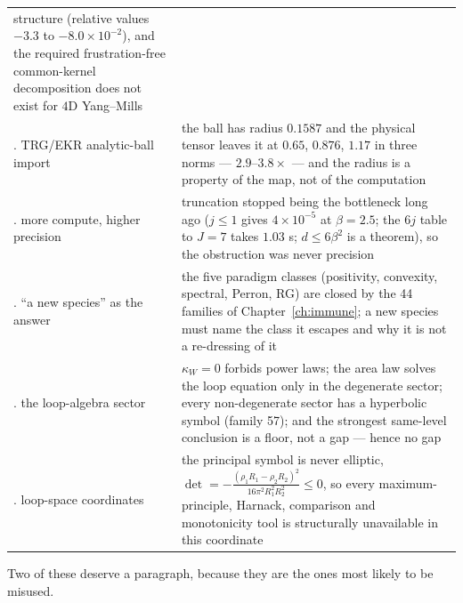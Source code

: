\begin{longtable}{@{}>{\raggedright\arraybackslash}p{3.35cm}
  >{\raggedright\arraybackslash}p{11.05cm}@{}}
structure (relative values $-3.3$ to $-8.0\times10^{-2}$), and the required frustration-free
common-kernel decomposition does not exist for $4$D Yang--Mills\\
53. TRG/EKR analytic-ball import &
the ball has radius $0.1587$ and the physical tensor leaves it at $0.65$, $0.876$, $1.17$ in three
norms --- $2.9$--$3.8\times$ --- and the radius is a property of the map, not of the computation\\
54. more compute, higher precision &
truncation stopped being the bottleneck long ago ($j\le1$ gives $4\times10^{-5}$ at $\beta=2.5$; the
$6j$ table to $J=7$ takes $1.03$ s; $d\le6\beta^2$ is a theorem), so the obstruction was never
precision\\
55. ``a new species'' as the answer &
the five paradigm classes (positivity, convexity, spectral, Perron, RG) are closed by the 44
families of Chapter~\ref{ch:immune}; a new species must name the class it escapes and why it is not
a re-dressing of it\\
56. the loop-algebra sector &
$\kappa_W=0$ forbids power laws; the area law solves the loop equation only in the degenerate
sector; every non-degenerate sector has a hyperbolic symbol (family 57); and the strongest
same-level conclusion is a floor, not a gap --- hence no gap\\
57. loop-space coordinates &
the principal symbol is never elliptic, $\det=-\tfrac{(\rho_1R_1-\rho_2R_2)^2}{16\pi^2R_1^2R_2^2}
\le0$, so every maximum-principle, Harnack, comparison and monotonicity tool is structurally
unavailable in this coordinate\\
\end{longtable}

\normalsize
Two of these deserve a paragraph, because they are the ones most likely to be misused.


